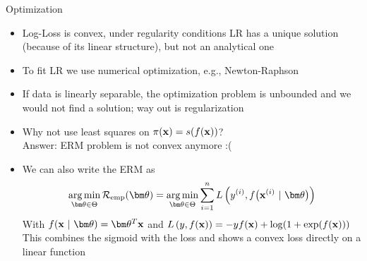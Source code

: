 \documentclass[11pt,compress,t,notes=noshow, xcolor=table]{beamer}
\begin{document}
\begin{vbframe}{Optimization}

\begin{itemize}

\item Log-Loss is convex, under regularity conditions LR has a unique solution (because of its linear structure), but not an analytical one

\item To fit LR we use numerical optimization, e.g., Newton-Raphson

\item If data is linearly separable, the optimization problem is unbounded and we would not find a solution; way out is regularization 

\item Why not use least squares on $\pi(\mathbf{x}) = s(f(\mathbf{x}))$? \\
Answer: ERM problem is not convex anymore :(

\item We can also write the ERM as  
$$
\argmin_{\thetav \in \Theta} \risket = \argmin_{\thetav \in \Theta} \sumin \Lxyit
$$
With $\fxt = \thetav^T \xv$ and 
$L\left(y, f(\mathbf{x})\right) = -y f(\mathbf{x}) + \log(1 + \exp(f(\mathbf{x}))) $\\
\lz
This combines the sigmoid with the loss and shows a convex loss directly on a linear function
\end{itemize}
\end{vbframe}



\endlecture
\end{document}
